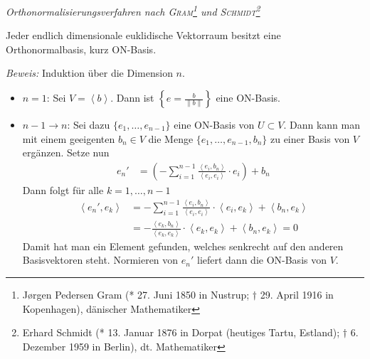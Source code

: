 \begin{mysatz} \textit{Orthonormalisierungsverfahren nach 
    \textsc{Gram}\footnote{J\o rgen Pedersen Gram (* 27. Juni 1850 in Nustrup; $\dagger$ 29. April 1916 in Kopenhagen), dänischer Mathematiker}
    und
    \textsc{Schmidt}\footnote{Erhard Schmidt (* 13. Januar 1876 in Dorpat (heutiges Tartu, Estland); $\dagger$ 6. Dezember 1959 in Berlin), dt. Mathematiker}}

    Jeder endlich dimensionale euklidische Vektorraum besitzt eine Orthonormalbasis, kurz ON-Basis.\medskip

    \textit{Beweis:} Induktion über die Dimension $n$.

    \begin{itemize}
        \item $n = 1$: Sei $V=\left\langle b \right\rangle$. Dann ist $\left\{ e = \frac{b}{\| b \|} \right\}$ eine ON-Basis.
        \item $n - 1 \rightarrow n$: Sei dazu $\{ e_1, \ldots, e_{n-1} \}$ eine ON-Basis von $U \subset V$.
            Dann kann man mit einem geeigenten $b_n\in V$ die Menge $\{ e_1, \ldots, e_{n-1}, b_n \}$ zu einer Basis von $V$ ergänzen.
            Setze nun
            \begin{align*}
                e_n' & = \left( - \sum\limits_{i = 1}^{n-1} \frac{ \left\langle e_i, b_n \right\rangle }{ \left\langle e_i, e_i \right\rangle } \cdot e_i \right) + b_n
            \end{align*}
            Dann folgt für alle $k = 1, \ldots, n-1$
            \begin{align*}
                \left\langle e_n', e_k \right\rangle & = - \sum_{i = 1}^{n-1} \frac{ \left\langle e_i, b_n \right\rangle }{ \left\langle e_i,e_i \right\rangle } \cdot 
                \left\langle e_i,e_k \right\rangle + \left\langle b_n,e_k \right\rangle \\
                & = - \frac{ \left\langle e_k,b_n \right\rangle }{ \left\langle e_k,e_k \right\rangle } \cdot \left\langle e_k,e_k \right\rangle + \left\langle b_n,e_k \right\rangle = 0
            \end{align*}
            Damit hat man ein Element gefunden, welches senkrecht auf den anderen Basisvektoren steht. Normieren von $e_n'$ liefert dann die ON-Basis von $V$.
    \end{itemize}
\end{mysatz}


